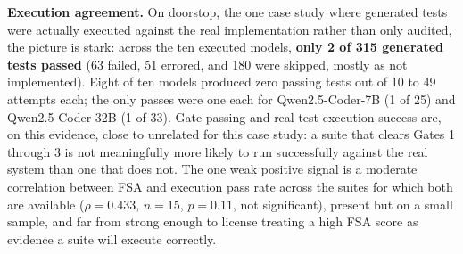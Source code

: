 \documentclass[conference]{IEEEtran}
\begin{document}
  \textbf{Execution agreement.} On doorstop, the one case study where generated
  tests were actually executed against the real implementation rather than only
  audited, the picture is stark: across the ten executed models, \textbf{only 2 of 315
  generated tests passed} (63 failed, 51 errored, and 180 were skipped,
  mostly as not implemented). Eight of ten models produced zero passing tests
  out of 10 to 49 attempts each; the only passes were one each for
  Qwen2.5-Coder-7B (1 of 25) and Qwen2.5-Coder-32B (1 of 33).
  Gate-passing and real test-execution success are, on this evidence, close to
  unrelated for this case study: a suite that clears Gates 1 through 3 is not
  meaningfully more likely to run successfully against the real system than one
  that does not. The one weak positive signal is a moderate correlation between
  FSA and execution pass rate across the suites for which both are available
  ($\rho=0.433$, $n=15$, $p=0.11$, not significant), present but on a small sample, and far from
  strong enough to license treating a high FSA score as evidence a suite will
  execute correctly.
\end{document}
